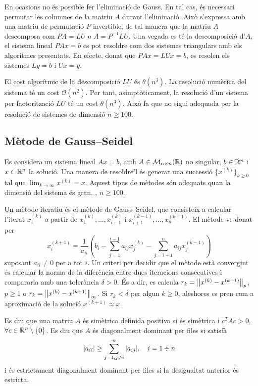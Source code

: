 En ocasions no és possible fer l'eliminació de Gauss. En tal cas, és necessari permutar les columnes de la matriu $A$ durant l'eliminació. Això s'expressa amb una matriu de permutació $P$ invertible, de tal manera que la matriu $A$ descomposa com $P A = L U$ o $A = P^{-1} L U$. Una vegada es té la descomposició d'$A$, el sistema lineal $P A x = b$ es pot resoldre com dos sistemes triangulars amb els algoritmes presentats. En efecte, donat que $P A x = L U x = b$, es resolen els sistemes $L y = b$ i $U x = y$. 

El cost algorítmic de la descomposició $L U$ és $\theta(n^3)$. La resolució numèrica del sistema té un cost $\mathcal{O}(n^2)$. Per tant, asimptòticament, la resolució d'un sistema per factorització $L U$ té un cost $\theta(n^3)$. Això fa que no sigui adequada per la resolució de sistemes de dimensió $n \geq 100$.

\subsection{Mètode de Gauss--Seidel}

Es considera un sistema lineal $A x = b$, amb $A \in \mathcal{M}_{n \times n}(\mathbb{R})$ no singular, $b \in \mathbb{R}^n$ i $x \in \mathbb{R}^n$ la solució. Una manera de resoldre'l és generar una successió $\{ x^{(k)} \}_{k \geq 0}$ tal que $\lim_{k \to \infty} x^{(k)} = x$. Aquest tipus de mètodes són adequats quan la dimensió del sistema és gran, \eg, $n \geq 100$.

Un mètode iteratiu és el mètode de Gauss--Seidel, que consisteix a calcular l'iterat $x_i^{(k)}$ a partir de $x_1^{(k)}, \ldots, x_{i-1}^{(k)}$ i $x_{i+1}^{(k-1)}, \ldots, x_{n}^{(k-1)}$. El mètode ve donat per
\[
	x_i^{(k+1)} = 
	\frac{1}{a_{ii}}
	\left(
	b_i - \sum_{j=1}^{i-1} a_{ij} x_j^{(k)} - \sum_{j=i+1}^n a_{ij} x_j^{(k-1)}
	\right)
\]
suposant $a_{ii} \neq 0$ per a tot $i$. Un criteri per decidir que el mètode està convergint és calcular la norma de la diferència entre dues iteracions consecutives i compararla amb una tolerància $\delta > 0$. És a dir, es calcula $r_k = \norm{x^{(k)} - x^{(k+1)}}_p$, $p \geq 1$ o $r_k = \norm{x^{(k)} - x^{(k+1)}}_\infty$. Si $r_k < \delta$ per algun $k \geq 0$, aleshores es pren com a aproximació de la solució $x^{(k+1)} \approx x$.

Es diu que una matriu $A$ és simètrica definida positiva si és simètrica i $c^T A c > 0$, $\forall c \in \mathbb{R}^n \setminus \{ 0 \}$. Es diu que $A$ és diagonalment dominant per files si satisfà
\[
	\abs{a_{ii}} \geq \sum_{j = 1, j \neq i}^n \abs{a_{i j}}, \quad i = 1 \divisionsymbol n
\]
i és estrictament diagonalment dominant per files si la desigualtat anterior és estricta.

